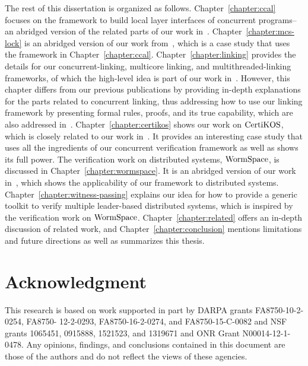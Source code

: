 The rest of this dissertation is organized as follows. Chapter~\ref{chapter:ccal} focuses on the framework to build local layer 
interfaces of concurrent programs--an abridged version of the related parts of our work in~\cite{concurrency}.
Chapter~\ref{chapter:mcs-lock} is an abridged version of our work from~\cite{mcslock},
which is a case study that uses the framework in Chapter~\ref{chapter:ccal}. 
Chapter~\ref{chapter:linking} provides the details for our concurrent-linking, multicore linking, and multithreaded-linking frameworks, 
of which the high-level idea is part of our work in~\cite{concurrency}.
However, this chapter differs from our previous publications by providing in-depth explanations for the parts related to concurrent linking, 
thus addressing how to use our linking framework by presenting formal rules, proofs, and its true capability, 
which are also addressed in~\cite{concurrency}.
Chapter~\ref{chapter:certikos} shows our work on $\mathrm{CertiKOS}$,
which is closely related to our work in~\cite{certikos:osdi16}. 
It provides an interesting case study that uses all the ingredients of our concurrent verification
 framework as well as shows its full power. The verification work on distributed systems, $\mathrm{WormSpace}$,
is discussed in Chapter~\ref{chapter:wormspace}.
It is an abridged version of our work in~\cite{wormspace},
which shows the applicability of our framework to distributed systems. 
Chapter~\ref{chapter:witness-passing} 
explains our idea for how to provide a generic toolkit to verify multiple leader-based distributed systems, 
which is inspired by the verification work on $\mathrm{WormSpace}$.
Chapter~\ref{chapter:related}
offers an in-depth discussion of related work, and  Chapter~\ref{chapter:conclusion}  
mentions limitations and future directions as well as summarizes this thesis.



\section{Acknowledgment}
This research is based on work supported in part by DARPA grants FA8750-10-2-0254, FA8750- 12-2-0293, FA8750-16-2-0274, and FA8750-15-C-0082 and NSF grants 1065451, 0915888, 1521523, and 1319671 and ONR Grant N00014-12-1-0478. Any opinions, findings, and conclusions contained in this document are those of the authors and do not reflect the views of these agencies.

